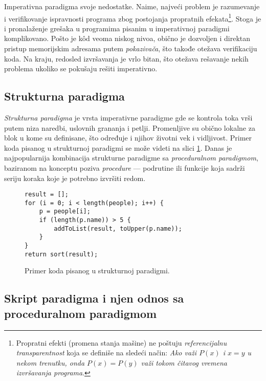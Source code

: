 Imperativna paradigma svoje nedostatke. Naime, najveći problem je razumevanje i verifikovanje ispravnosti programa zbog postojanja propratnih efekata\footnote{Propratni efekti (promena stanja mašine) ne poštuju \emph{referencijalnu transparentnost} koja se definiše na sledeći način: \emph{Ako važi $P(x)$ i $x = y$ u nekom trenutku, onda $P(x) = P(y)$ važi tokom čitavog vremena izvršavanja programa}.}. Stoga je i pronalaženje grešaka u programima pisanim u imperativnoj paradigmi komplikovano. Pošto je k\^od veoma niskog nivoa, obično je dozvoljen i direktan pristup memorijskim adresama putem \emph{pokazivača}, što takođe otežava verifikaciju koda. Na kraju, redosled izvršavanja je vrlo bitan, što otežava rešavanje nekih problema ukoliko se pokušaju rešiti imperativno.


\subsection{Strukturna paradigma}
\label{subsec:ParadigmImperativeStructural}

\emph{Strukturna paradigma} je vrsta imperativne paradigme gde se kontrola toka vrši putem niza naredbi, uslovnih grananja i petlji. Promenljive su obično lokalne za blok u kome su definisane, što određuje i njihov životni vek i vidljivost. Primer koda pisanog u strukturnoj paradigmi se može videti na slici \ref{fig:ParadigmStructural}. Danas je najpopularnija kombinacija strukturne paradigme sa \emph{proceduralnom paradigmom}, baziranom na konceptu poziva \emph{procedure} --- podrutine ili funkcije koja sadrži seriju koraka koje je potrebno izvršiti redom.

\begin{figure}[h!]
\begin{lstlisting}
result = [];
for (i = 0; i < length(people); i++) {
    p = people[i];
    if (length(p.name)) > 5 {
        addToList(result, toUpper(p.name));
    }
}
return sort(result);
\end{lstlisting}
\caption{Primer koda pisanog u strukturnoj paradigmi.}
\label{fig:ParadigmStructural}
\end{figure}


\subsection{Skript paradigma i njen odnos sa proceduralnom paradigmom}
\label{subsec:Languages}

